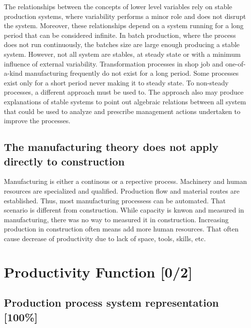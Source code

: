 \documentclass{article}
\begin{document}
The relationships between the concepts of lower level variables rely on stable production systems, where variability performs a minor role and does not disrupt the system.
Moreover, these relationships depend on a system running for a long period that can be considered infinite.
In batch production, where the process does not run continuously, the batches size are large enough producing a stable system.
However, not all system are stables, at steady state or with a minimum influence of external variability.
Transformation processes in shop job and one-of-a-kind manufacturing frequently do not exist for a long period.
Some processes exist only for a short period never making it to steady state.
To non-steady processes, a different approach must be used to.
The approach also may produce explanations of stable systems to point out algebraic relations between all system that could be used to analyze and prescribe management actions undertaken to improve the processes.

\subsection{The manufacturing theory does not apply directly to construction}
\label{sec:org6624b08}

Manufacturing is either a continous or a repective process.
Machinery and human resources are specialized and qualified.
Production flow and material routes are established. 
Thus, most manufacturing processess can be automated.
That scenario is different from construction.
While capacity is knwon and measured in manufacturing, there was no way to measured it in construction.
Increasing production in construction often means add more human resources.
That often cause decrease of productivity due to lack of space, tools, skills, etc.

\section{Productivity Function [0/2]}
\label{sec:orgca08c53}
\subsection{Production process system representation [100\%]}
\label{sec:org64fda99}
\end{document}
